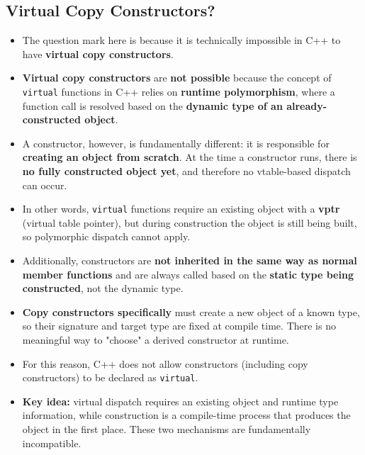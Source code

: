 \documentclass[10pt]{article}
\newcommand{\pbreak}{\vspace{30pt}}
\begin{document}
\newpage
\subsection{Virtual Copy Constructors?}
\begin{itemize}
	\item The question mark here is because it is technically impossible in C++ to have \textbf{virtual copy constructors}.

	\item \textbf{Virtual copy constructors} are \textbf{not possible} because the concept of \texttt{virtual} functions in C++ relies on \textbf{runtime polymorphism}, where a function call is resolved based on the \textbf{dynamic type of an already-constructed object}.

	\item A constructor, however, is fundamentally different: it is responsible for \textbf{creating an object from scratch}. At the time a constructor runs, there is \textbf{no fully constructed object yet}, and therefore no vtable-based dispatch can occur.

	\item In other words, \texttt{virtual} functions require an existing object with a \textbf{vptr} (virtual table pointer), but during construction the object is still being built, so polymorphic dispatch cannot apply.

	\item Additionally, constructors are \textbf{not inherited in the same way as normal member functions} and are always called based on the \textbf{static type being constructed}, not the dynamic type.

	\item \textbf{Copy constructors specifically} must create a new object of a known type, so their signature and target type are fixed at compile time. There is no meaningful way to "choose" a derived constructor at runtime.

	\item For this reason, C++ does not allow constructors (including copy constructors) to be declared as \texttt{virtual}.

	\item \textbf{Key idea:} virtual dispatch requires an existing object and runtime type information, while construction is a compile-time process that produces the object in the first place. These two mechanisms are fundamentally incompatible.

		\pbreak


\end{itemize}
\end{document}
